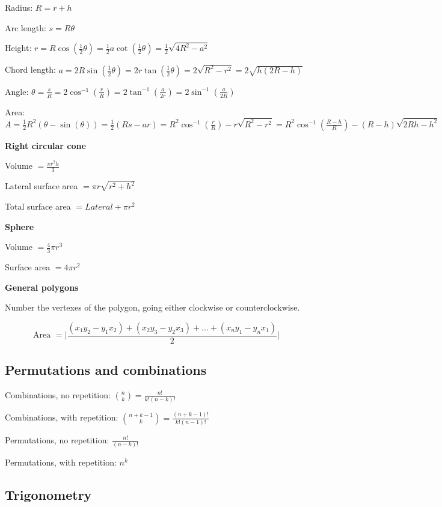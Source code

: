 Radius: $R = r + h$

Arc length: $s = R \theta$

Height: $r = R \cos(\frac{1}{2} \theta) = \frac{1}{2} a \cot(\frac{1}{2} \theta) = \frac{1}{2} \sqrt{4 R^2 - a^2}$

Chord length: $a = 2R \sin(\frac{1}{2} \theta) = 2r \tan (\frac{1}{2} \theta) = 2 \sqrt{R^2 - r^2} = 2 \sqrt{h (2R - h)}$

Angle: $\theta = \frac{s}{R} = 2 \cos^{-1}(\frac{r}{R}) = 2 \tan^{-1}(\frac{a}{2r}) = 2 \sin^{-1}(\frac{a}{2R})$

Area: $A = \frac{1}{2} R^2 (\theta - \sin (\theta)) = \frac{1}{2} (Rs - ar) = R^2 \cos^{-1}(\frac{r}{R}) - r \sqrt{R^2 - r^2} = R^2 \cos^{-1}(\frac{R-h}{R}) - (R-h)\sqrt{2Rh - h^2}$

\textbf{Right circular cone}

Volume $= \frac{\pi r^2 h}{3}$

Lateral surface area $= \pi r \sqrt{r^2 + h^2}$

Total surface area $= Lateral + \pi r^2$

\textbf{Sphere}

Volume $= \frac{4}{3} \pi r^3$

Surface area $= 4 \pi r^2$

\textbf{General polygons}

Number the vertexes of the polygon, going either clockwise or counterclockwise.

$$\text{Area } = \Bigg\lvert \frac{(x_1 y_2 - y_1 x_2) + (x_2 y_3 - y_2 x_3) + ... + (x_n y_1 - y_n x_1)}{2} \Bigg\rvert$$

\subsection*{Permutations and combinations}

Combinations, no repetition: $\displaystyle \binom{n}{k} = \frac{n!}{k! (n-k)!}$

Combinations, with repetition: $\displaystyle \binom{n + k - 1}{k} = \frac{(n+k-1)!}{k! (n-1)!}$

Permutations, no repetition: $\displaystyle \frac{n!}{(n-k)!}$

Permutations, with repetition: $n^k$

\subsection*{Trigonometry}

